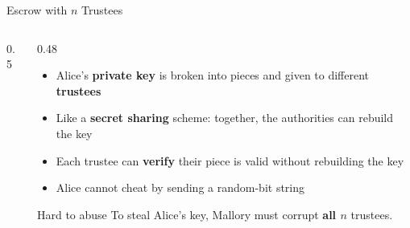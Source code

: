 \documentclass[aspectratio=169,11pt,xcolor={table}]{beamer}
\begin{document}
\begin{frame}{Escrow with $n$ Trustees}
  \begin{columns}[c]
    \begin{column}{0.5\textwidth}
      \centering
    \end{column}
    \begin{column}{0.48\textwidth}
      \begin{itemize}\small\setlength{\itemsep}{4pt}
        \item Alice's \textbf{private key} is broken into pieces and given to different \textbf{trustees}
        \item Like a \textbf{secret sharing} scheme: together, the authorities can rebuild the key
        \item Each trustee can \textbf{verify} their piece is valid without rebuilding the key
        \item Alice cannot cheat by sending a random-bit string
      \end{itemize}
      \begin{alertblock}{Hard to abuse}
        \small To steal Alice's key, Mallory must corrupt \textbf{all $n$} trustees.
      \end{alertblock}
    \end{column}
  \end{columns}
\end{frame}
\end{document}
